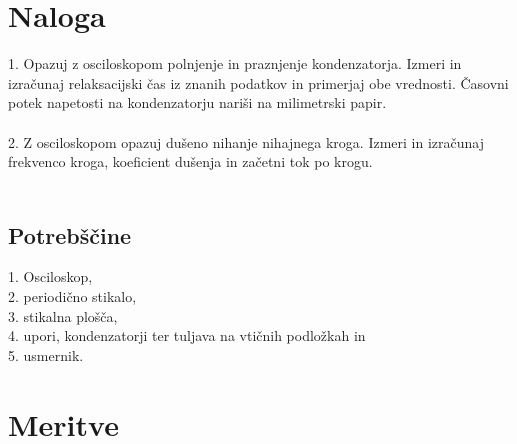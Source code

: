 \documentclass[a4paper]{report}
\begin{document}
\chapter*{Naloga}
1. Opazuj z osciloskopom polnjenje in praznjenje kondenzatorja. Izmeri in izračunaj relaksacijski čas iz znanih podatkov in primerjaj obe vrednosti. Časovni potek napetosti na kondenzatorju nariši na milimetrski papir.\\
\\
2. Z osciloskopom opazuj dušeno nihanje nihajnega kroga. Izmeri in izračunaj frekvenco kroga, koeficient dušenja in začetni tok po krogu.\\
\\
\section*{Potrebščine}
1. Osciloskop,\\
2. periodično stikalo, \\
3. stikalna plošča, \\
4. upori, kondenzatorji ter tuljava na vtičnih podložkah in\\
5. usmernik.
\newpage


\chapter*{Meritve}
\end{document}
